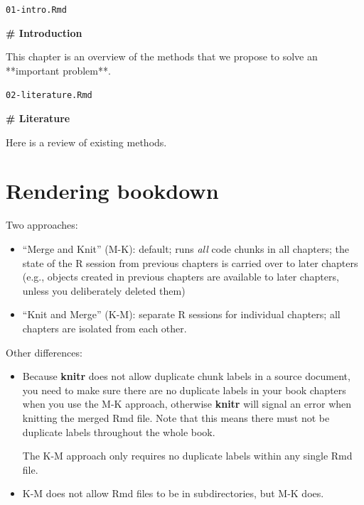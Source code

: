\documentclass[
  a4paper,
  twoside,
  openright]{book}
\newenvironment{Shaded}{\begin{snugshade}}{\end{snugshade}}
\newcommand{\FunctionTok}[1]{\textcolor[rgb]{0.13,0.29,0.53}{\textbf{#1}}}
\newcommand{\NormalTok}[1]{#1}
\providecommand{\tightlist}{%
  \setlength{\itemsep}{0pt}\setlength{\parskip}{0pt}}
\theoremstyle{definition}
\theoremstyle{definition}
\theoremstyle{definition}
\theoremstyle{definition}
\theoremstyle{remark}
\begin{document}
\texttt{01-intro.Rmd}

\begin{Shaded}
\begin{Highlighting}[]
\FunctionTok{\# Introduction}

\NormalTok{This chapter is an overview of the methods that}
\NormalTok{we propose to solve an **important problem**.}
\end{Highlighting}
\end{Shaded}

\texttt{02-literature.Rmd}

\begin{Shaded}
\begin{Highlighting}[]
\FunctionTok{\# Literature}

\NormalTok{Here is a review of existing methods.}
\end{Highlighting}
\end{Shaded}

\section{Rendering bookdown}\label{rendering-bookdown}

Two approaches:

\begin{itemize}
\tightlist
\item
  ``Merge and Knit'' (M-K): default; runs \emph{all} code chunks in all chapters; the state of the R session from previous chapters is carried over to later chapters (e.g., objects created in previous chapters are available to later chapters, unless you deliberately deleted them)
\item
  ``Knit and Merge'' (K-M): separate R sessions for individual chapters; all chapters are isolated from each other.
\end{itemize}

Other differences:

\begin{itemize}
\item
  Because \textbf{knitr} does not allow duplicate chunk labels in a source document, you need to make sure there are no duplicate labels in your book chapters when you use the M-K approach, otherwise \textbf{knitr} will signal an error when knitting the merged Rmd file. Note that this means there must not be duplicate labels throughout the whole book.

  The K-M approach only requires no duplicate labels within any single Rmd file.
\item
  K-M does not allow Rmd files to be in subdirectories, but M-K does.
\end{itemize}
\end{document}
